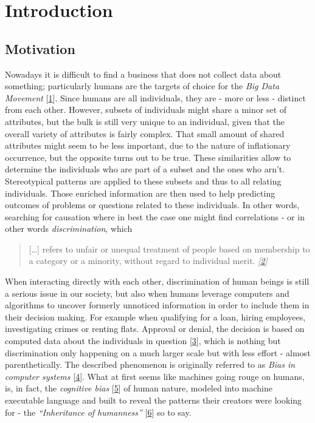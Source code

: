 \documentclass[12pt,english,a4paper,titlepage,cleardoublepage=empty,dottedtoc]{report}
\begin{document}
\chapter{Introduction}\label{introduction}

\section{Motivation}\label{motivation}

Nowadays it is difficult to find a business that does not collect data
about something; particularly humans are the targets of choice for the
\emph{Big Data Movement}
{[}\protect\hyperlink{ref-web_2016_privacy-international-about-big-data}{1}{]}.
Since humans are all individuals, they are - more or less - distinct
from each other. However, subsets of individuals might share a minor set
of attributes, but the bulk is still very unique to an individual, given
that the overall variety of attributes is fairly complex. That small
amount of shared attributes might seem to be less important, due to the
nature of inflationary occurrence, but the opposite turns out to be
true. These similarities allow to determine the individuals who are part
of a subset and the ones who arn't. Stereotypical patterns are applied
to these subsets and thus to all relating individuals. Those enriched
information are then used to help predicting outcomes of problems or
questions related to these individuals. In other words, searching for
causation where in best the case one might find correlations - or in
other words \emph{discrimination}, which

\begin{quote}
{[}\ldots{}{]} refers to unfair or unequal treatment of people based on
membership to a category or a minority, without regard to individual
merit.
\emph{{[}\protect\hyperlink{ref-paper_2008_discrimination-aware-data-mining}{2}{]}}
\end{quote}

When interacting directly with each other, discrimination of human
beings is still a serious issue in our society, but also when humans
leverage computers and algorithms to uncover formerly unnoticed
information in order to include them in their decision making. For
example when qualifying for a loan, hiring employees, investigating
crimes or renting flats. Approval or denial, the decision is based on
computed data about the individuals in question
{[}\protect\hyperlink{ref-book_2015_ethical-it-innovation_ethical-uses-of-information-and-knowledge}{3}{]},
which is nothing but discrimination only happening on a much larger
scale but with less effort - almost parenthetically. The described
phenomenon is originally referred to as \emph{Bias in computer systems}
{[}\protect\hyperlink{ref-paper_1996_bias-in-computer-systems}{4}{]}.
What at first seems like machines going rouge on humans, is, in fact,
the \emph{cognitive bias}
{[}\protect\hyperlink{ref-wikipedia_2016_cognitive-bias}{5}{]} of human
nature, modeled into machine executable language and built to reveal the
patterns their creators were looking for - the \emph{``Inheritance of
humanness''}
{[}\protect\hyperlink{ref-web_2016_big-data-is-people}{6}{]} so to say.
\end{document}
